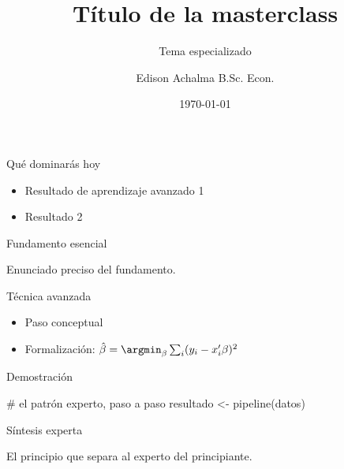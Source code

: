\documentclass{academic-beamer}
\title{Título de la masterclass}
\subtitle{Tema especializado}
\author{Edison Achalma B.Sc. Econ.}
\institute{Universidad Nacional de San Cristóbal de Huamanga}
\date{\today}
\begin{document}
\begin{frame}\titlepage\end{frame}

\begin{frame}{Qué dominarás hoy}
\begin{itemize}\item Resultado de aprendizaje avanzado 1 \item Resultado 2\end{itemize}
\end{frame}

\begin{frame}{Fundamento esencial}
\begin{definicion}Enunciado preciso del fundamento.\end{definicion}
\end{frame}

\begin{frame}{Técnica avanzada}
\begin{itemize}\item Paso conceptual \item Formalización: $\hat\beta=\argmin_\beta\sum_i(y_i-x_i'\beta)^2$\end{itemize}
\end{frame}

\begin{frame}[fragile]{Demostración}
\begin{codigo}[language=R]
# el patrón experto, paso a paso
resultado <- pipeline(datos)
\end{codigo}
\end{frame}

\begin{frame}{Síntesis experta}
\begin{importante}El principio que separa al experto del principiante.\end{importante}
\end{frame}
\end{document}
